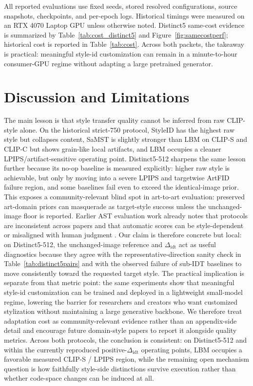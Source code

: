 \documentclass[letterpaper]{article}
\begin{document}
All reported evaluations use fixed seeds, stored resolved configurations, source snapshots, checkpoints, and per-epoch logs. Historical timings were measured on an RTX 4070 Laptop GPU unless otherwise noted. Distinct5 same-cost evidence is summarized by Table~\ref{tab:cost_distinct5} and Figure~\ref{fig:samecostperf}; historical cost is reported in Table~\ref{tab:cost}. Across both packets, the takeaway is practical: meaningful style-id customization can remain in a minute-to-hour consumer-GPU regime without adapting a large pretrained generator.



\section{Discussion and Limitations}
The main lesson is that style transfer quality cannot be inferred from raw CLIP-style alone. On the historical strict-750 protocol, StyleID has the highest raw style but collapses content, SaMST is slightly stronger than LBM on CLIP-S and CLIP-C but shows grain-like local artifacts, and LBM occupies a cleaner LPIPS/artifact-sensitive operating point. Distinct5-512 sharpens the same lesson further because its no-op baseline is measured explicitly: higher raw style is achievable, but only by moving into a severe LPIPS and targetwise ArtFID failure region, and some baselines fail even to exceed the identical-image prior. This exposes a community-relevant blind spot in art-to-art evaluation: preserved art-domain priors can masquerade as target-style success unless the unchanged-image floor is reported. Earlier AST evaluation work already notes that protocols are inconsistent across papers and that automatic scores can be style-dependent or misaligned with human judgment \cite{zhou2024comprehensiveeval,yeh2020calibrated,wright2022artfid}. Our claim is therefore concrete but local: on Distinct5-512, the unchanged-image reference and $\Delta_{\mathrm{idt}}$ act as useful diagnostics because they agree with the representative-direction sanity check in Table~\ref{tab:distinct5pairs} and with the observed failure of sub-IDT baselines to move consistently toward the requested target style. The practical implication is separate from that metric point: the same experiments show that meaningful style-id customization can be trained and deployed in a lightweight small-model regime, lowering the barrier for researchers and creators who want customized stylization without maintaining a large generative backbone. We therefore treat adaptation cost as community-relevant evidence rather than an appendix-side detail and encourage future domain-style papers to report it alongside quality metrics. Across both protocols, the conclusion is consistent: on Distinct5-512 and within the currently reproduced positive-$\Delta_{\mathrm{idt}}$ operating points, LBM occupies a favorable measured CLIP-S / LPIPS region, while the remaining open mechanism question is how faithfully style-side distinctions survive execution rather than whether code-space changes can be induced at all.
\end{document}
